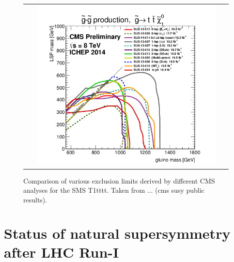 \begin{figure}[!tp]
  \centering
  \begin{tabular}{c}
    \includegraphics[width=0.9\textwidth]{figures/T1tttt_ICHEP2014_All.png}
  \end{tabular}
  \caption{Comparison of various exclusion limits derived by different CMS analyses for the SMS T1tttt. Taken from ... (cms susy public results).}
  \label{fig:T1_comp}
\end{figure}

\section{Status of natural supersymmetry after LHC Run-I}
\label{sec:susy_status}


